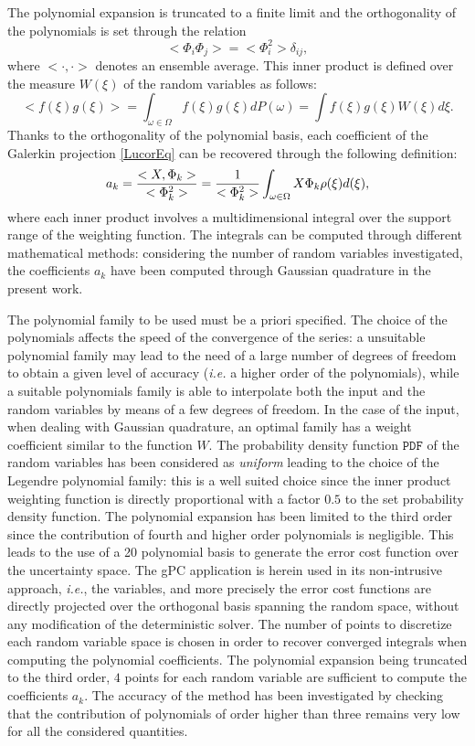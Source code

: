 \documentclass[conf]{new-aiaa}
\begin{document}
The polynomial expansion is truncated to a finite limit and the orthogonality of the polynomials is set through the relation
%
\begin{equation}
<\Phi_i \Phi_j>=<\Phi_i^2> \delta_{ij},
\end{equation}
%
where $<\cdot,\cdot>$ denotes an ensemble average.
%
This inner product is defined over the measure $W(\xi)$ of the random variables as follows:
%
\begin{equation}
<f(\xi)g(\xi)>= \int_{\omega \in \Omega} f(\xi)g(\xi)dP(\omega)= \int f(\xi)g(\xi) W(\xi) d \xi.
\end{equation}
%
Thanks to the orthogonality of the polynomial basis, each coefficient of the Galerkin projection \eqref{LucorEq} can be recovered through the following definition:
%
\begin{equation}
a_k = \frac{<X,\Phi_k>}{<\Phi_{k}^2>}= \frac{1}{<\Phi_{k}^2>}\int_{\omega \in \Omega} X \Phi_k \rho({\bf \xi}) d({\bf \xi}),
\end{equation}
%
where each inner product involves a multidimensional integral over the support range of the weighting function.
%
The integrals can be computed through different mathematical methods: considering the number of random variables investigated, the coefficients $a_k$ have been computed through Gaussian quadrature in the present work.

The polynomial family to be used must be a priori specified. The choice of the polynomials affects the speed of the convergence of the series: a unsuitable polynomial family may lead to the need of a large number of degrees of freedom to obtain a given level of accuracy (\textit{i.e.} a higher order of the polynomials), while a suitable polynomials family is able to interpolate both the input and the random variables by means of a few degrees of freedom.
%
In the case of the input, when dealing with Gaussian quadrature, an optimal family has a weight coefficient similar to the function $W$.
%
The probability density function $\texttt{PDF}$ of the random variables has been considered as \textit{uniform} leading to the choice of the Legendre polynomial family: this is a well suited choice since the inner product weighting function is directly proportional with a factor $0.5$ to the set probability density function.
%
The polynomial expansion has been limited to the third order since the contribution of fourth and higher order polynomials is negligible.
%
This leads to the use of a 20 polynomial basis to generate the error cost function over the uncertainty space. 
%
The gPC application is herein used in its non-intrusive approach, \textit{i.e.}, the variables, and more precisely the error cost functions are directly projected over the orthogonal basis spanning the random space, without any modification of the deterministic solver. 
%
The number of points to discretize each random variable space is chosen in order to recover converged integrals when computing the polynomial coefficients.
%
The polynomial expansion being truncated to the third order, $4$ points for each random variable are sufficient to compute the coefficients $a_k$.
%
The accuracy of the method has been investigated by checking that the contribution of polynomials of order higher than three remains very low for all the considered quantities. 



\end{document}
